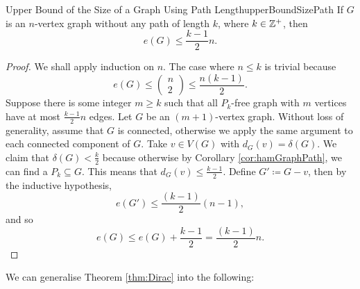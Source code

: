 \documentclass[math, code]{amznotes}
\theoremstyle{remark}
\begin{document}
\begin{corbox}{Upper Bound of the Size of a Graph Using Path Length}{upperBoundSizePath}
    If $G$ is an $n$-vertex graph without any path of length $k$, where $k \in \mathbb{Z}^+$, then 
    \begin{equation*}
        e(G) \leq \frac{k - 1}{2}n.
    \end{equation*}
    \tcblower
    \begin{proof}
        We shall apply induction on $n$. The case where $n \leq k$ is trivial because
        \begin{equation*}
            e(G) \leq \begin{pmatrix}
                n \\
                2
            \end{pmatrix} \leq \frac{n(k - 1)}{2}.
        \end{equation*}
        Suppose there is some integer $m \geq k$ such that all $P_k$-free graph with $m$ vertices have at most $\frac{k - 1}{2}n$ edges. Let $G$ be an $(m + 1)$-vertex graph. Without loss of generality, assume that $G$ is connected, otherwise we apply the same argument to each connected component of $G$. Take $v \in V(G)$ with $d_G(v) = \delta(G)$. We claim that $\delta(G) < \frac{k}{2}$ because otherwise by Corollary \ref{cor:hamGraphPath}, we can find a $P_k \subseteq G$. This means that $d_G(v) \leq \frac{k - 1}{2}$. Define $G' \coloneqq G - v$, then by the inductive hypothesis, 
        \begin{equation*}
            e(G') \leq \frac{(k - 1)}{2}(n - 1),
        \end{equation*}
        and so 
        \begin{equation*}
            e(G) \leq e(G) + \frac{k - 1}{2} = \frac{(k - 1)}{2}n.
        \end{equation*}
    \end{proof}
\end{corbox}
We can generalise Theorem \ref{thm:Dirac} into the following:
\end{document}
